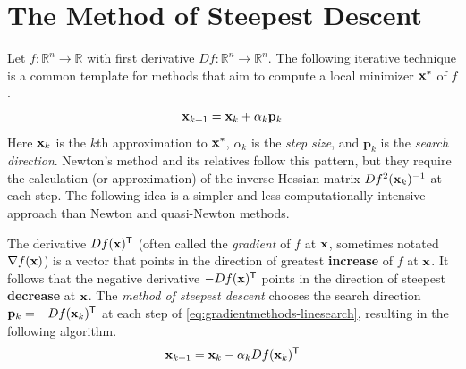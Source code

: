 

\section*{The Method of Steepest Descent} %

Let $f:\mathbb{R}^n \rightarrow \mathbb{R}$ with first derivative $Df:\mathbb{R}^n \rightarrow \mathbb{R}^n$.
The following iterative technique is a common template for methods that aim to compute a local minimizer $\mathbf{x}^*$ of $f$.
\begin{equation}
\mathbf{x}_{k+1} = \mathbf{x}_k + \alpha_{k}\mathbf{p}_k
\label{eq:gradientmethods-linesearch}
\end{equation}
Here $\mathbf{x}_k$ is the $k$th approximation to $\mathbf{x}^*$, $\alpha_k$ is the \emph{step size}, and $\mathbf{p}_k$ is the \emph{search direction}.
Newton's method and its relatives follow this pattern, but they require the calculation (or approximation) of the inverse Hessian matrix $Df^2(\mathbf{x}_k)^{-1}$ at each step.
The following idea is a simpler and less computationally intensive approach than Newton and quasi-Newton methods.

The derivative $Df(\mathbf{x})^{\mathsf T}$ (often called the \emph{gradient} of $f$ at $\mathbf{x}$, sometimes notated $\nabla f(\mathbf{x})$) is a vector that points in the direction of greatest \textbf{increase} of $f$ at $\mathbf{x}$.
It follows that the negative derivative $-Df(\mathbf{x})^{\mathsf T}$ points in the direction of steepest \textbf{decrease} at $\mathbf{x}$.
The \emph{method of steepest descent} chooses the search direction $\mathbf{p}_k = -Df(\mathbf{x}_k)^{\mathsf T}$ at each step of \eqref{eq:gradientmethods-linesearch}, resulting in the following algorithm.
\begin{equation}
\mathbf{x}_{k+1} = \mathbf{x}_k - \alpha_{k}Df(\mathbf{x}_k)^{\mathsf T}
\label{eq:gradientmethods-steepest-descent}
\end{equation}

